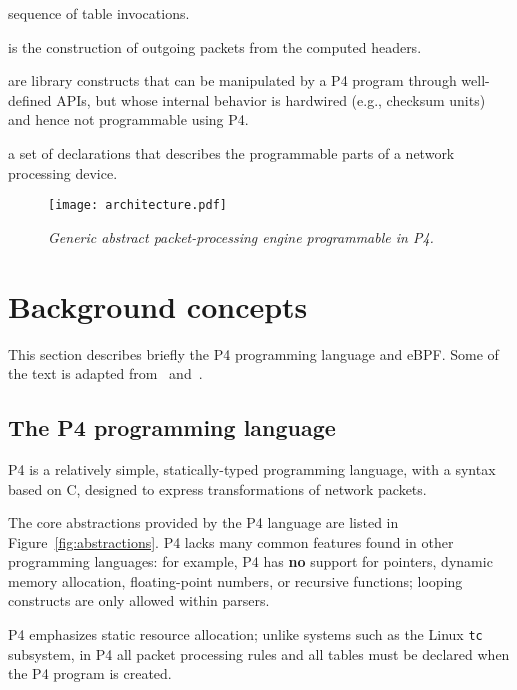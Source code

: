 \begin{figure*}[h]
\begin{mdframed}[style=mdstyle]
\begin{description}
			sequence of table invocations.
			\item[Deparsing] is the construction of outgoing packets from the
			computed headers.
			\item[Extern objects] are library constructs that can be manipulated
			by a P4 program through well-defined APIs, but whose internal
			behavior is hardwired (e.g., checksum units) and hence not
			programmable using P4.
			\item[Architecture definition:] a set of declarations that describes
			the programmable parts of a network processing device.
		\end{description}
	\end{mdframed}
	\caption{\sl Core abstractions of the P4 programming 
	language.\label{fig:abstractions}}
\end{figure*}

\begin{figure}[ht]
	\centerline{\texttt{[image: architecture.pdf]}}
	\caption{\sl Generic abstract packet-processing engine programmable
		in P4.\label{fig:architecture}}
\end{figure}
\section{Background concepts}\label{sec:background}

This section describes briefly the P4 programming language and
eBPF. Some of the text is adapted from~\cite{budiu-osr17}
and~\cite{p4-ebpf-backend}.

\subsection{The P4 programming language}

P4 is a relatively
simple, statically-typed programming language, with a syntax based on
C, designed to express transformations of network packets.

The core abstractions provided by the P4 language are listed in
Figure~\ref{fig:abstractions}.  P4 lacks many common features found in
other programming languages: for example, P4 has \textbf{no} support
for pointers, dynamic memory allocation, floating-point numbers, or
recursive functions; looping constructs are only allowed within
parsers.

P4 emphasizes static resource allocation; unlike systems such as the
Linux \texttt{tc} subsystem, in P4 all packet processing rules and all tables
must be declared when the P4 program is created.


